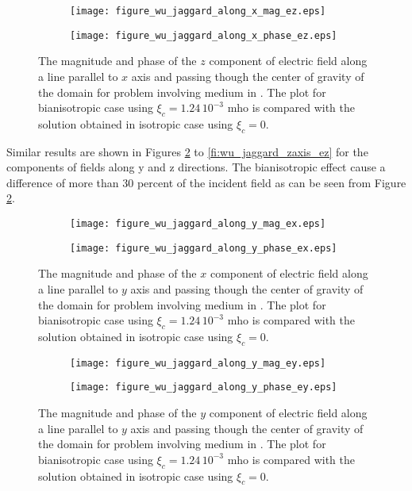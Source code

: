 \begin{figure}
\centering
\begin{subfigure}[b]{0.49\textwidth}
\texttt{[image: figure\_wu\_jaggard\_along\_x\_mag\_ez.eps]}
\end{subfigure}
%
\begin{subfigure}[b]{0.49\textwidth}
\centering
\texttt{[image: figure\_wu\_jaggard\_along\_x\_phase\_ez.eps]}
\end{subfigure}
\caption{The magnitude and phase of the $z$ component of electric field along a line parallel to $x$ axis 
and passing though the center of gravity of the domain for problem involving 
medium in \cite{wujaggard}. 
The plot for bianisotropic case  using $\xi_c = 1.24\,10^{-3}$ mho is compared with 
the solution obtained in isotropic case using $\xi_c = 0$.}
\label{fi:wu_jaggard_xaxis_ez}
\end{figure}

Similar results are shown in Figures \ref{fi:wu_jaggard_yaxis_ex} to 
\ref{fi:wu_jaggard_zaxis_ez} for the components of fields along y and 
z directions. 
The bianisotropic effect cause a difference of more than 30 percent of the incident 
field  as can be seen from Figure  \ref{fi:wu_jaggard_yaxis_ex}.

\begin{figure}
\centering
\begin{subfigure}[b]{0.49\textwidth}
\texttt{[image: figure\_wu\_jaggard\_along\_y\_mag\_ex.eps]}
\end{subfigure}
%
\begin{subfigure}[b]{0.49\textwidth}
\centering
\texttt{[image: figure\_wu\_jaggard\_along\_y\_phase\_ex.eps]}
\end{subfigure}
\caption{The magnitude and phase of the $x$ component of electric field along a line parallel to $y$ axis 
and passing though the center of gravity of the domain for problem involving 
medium in \cite{wujaggard}. 
The plot for bianisotropic case  using $\xi_c = 1.24\,10^{-3}$ mho is compared with 
the solution obtained in isotropic case using $\xi_c = 0$.}
\label{fi:wu_jaggard_yaxis_ex}
\end{figure}

\begin{figure}
\centering
\begin{subfigure}[b]{0.49\textwidth}
\texttt{[image: figure\_wu\_jaggard\_along\_y\_mag\_ey.eps]}
\end{subfigure}
%
\begin{subfigure}[b]{0.49\textwidth}
\centering
\texttt{[image: figure\_wu\_jaggard\_along\_y\_phase\_ey.eps]}
\end{subfigure}
\caption{The magnitude and phase of the $y$ component of electric field along a line parallel to $y$ axis 
and passing though the center of gravity of the domain for problem involving 
medium in \cite{wujaggard}. 
The plot for bianisotropic case  using $\xi_c = 1.24\,10^{-3}$ mho is compared with 
the solution obtained in isotropic case using $\xi_c = 0$.}
\label{fi:wu_jaggard_yaxis_ey}
\end{figure}

